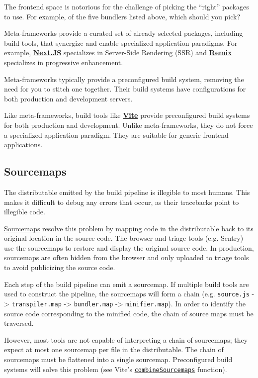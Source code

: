\documentclass{article}
\begin{document}
The frontend space is notorious for the challenge of picking the ``right'' packages to use. For
example, of the five bundlers listed above, which should you pick?

Meta-frameworks provide a curated set of already selected packages, including build tools, that
synergize and enable specialized application paradigms. For example,
\href{https://nextjs.org}{\textbf{Next.JS}} specializes in Server-Side Rendering (SSR) and
\href{https://remix.run}{\textbf{Remix}} specializes in progressive enhancement.

Meta-frameworks typically provide a preconfigured build system, removing the need for you to stitch
one together. Their build systems have configurations for both production and development servers.

Like meta-frameworks, build tools like \href{https://vitejs.dev/}{\textbf{Vite}} provide
preconfigured build systems for both production and development. Unlike meta-frameworks, they do not
force a specialized application paradigm. They are suitable for generic frontend applications.

\subsection{Sourcemaps}

The distributable emitted by the build pipeline is illegible to most humans. This makes it difficult
to debug any errors that occur, as their tracebacks point to illegible code.

\href{https://developer.chrome.com/blog/sourcemaps/}{Sourcemaps} resolve this problem by mapping
code in the distributable back to its original location in the source code. The browser and triage
tools (e.g. Sentry) use the sourcemaps to restore and display the original source code. In
production, sourcemaps are often hidden from the browser and only uploaded to triage tools to avoid
publicizing the source code.

Each step of the build pipeline can emit a sourcemap. If multiple build tools are used to construct
the pipeline, the sourcemaps will form a chain (e.g. \texttt{source.js} -> \texttt{transpiler.map}
-> \texttt{bundler.map} -> \texttt{minifier.map}). In order to identify the source code
corresponding to the minified code, the chain of source maps must be traversed.

However, most tools are not capable of interpreting a chain of sourcemaps; they expect at most one
sourcemap per file in the distributable. The chain of sourcemaps must be flattened into a single
sourcemap. Preconfigured build systems will solve this problem (see Vite's
\href{https://github.com/vitejs/vite/blob/feae09fdfab505e58950c915fe5d8dd103d5ffb9/packages/vite/src/node/utils.ts\#L831}{\texttt{combineSourcemaps}}
function).
\end{document}
